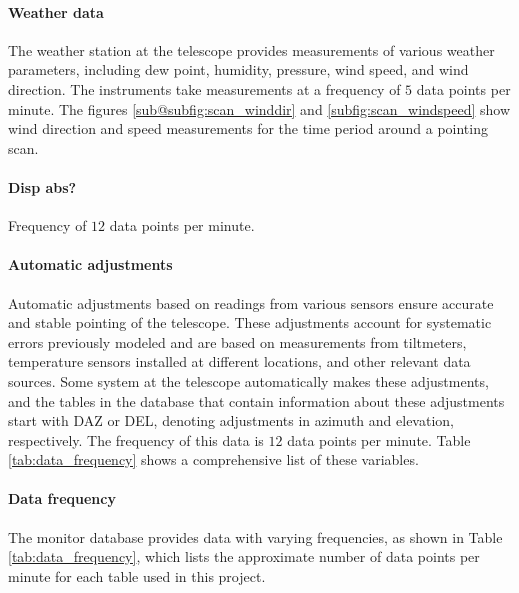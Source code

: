 \paragraph{Weather data}
The weather station at the telescope provides measurements of various weather parameters, including dew point, humidity, pressure, wind speed, and wind direction.
The instruments take measurements at a frequency of $5$ data points per minute.
The figures \ref{sub@subfig:scan_winddir} and \ref{subfig:scan_windspeed} show wind direction and speed measurements for the time period around a pointing scan.


\paragraph{Disp abs?}

Frequency of $12$ data points per minute.

\paragraph{Automatic adjustments}
Automatic adjustments based on readings from various sensors ensure accurate and stable pointing of the telescope.
These adjustments account for systematic errors previously modeled and are based on measurements from tiltmeters, temperature sensors installed at different locations, and other relevant data sources.
Some system at the telescope automatically makes these adjustments, and the tables in the database that contain information about these adjustments start with DAZ or DEL, denoting adjustments in azimuth and elevation, respectively.
The frequency of this data is $12$ data points per minute.
Table \ref{tab:data_frequency} shows a comprehensive list of these variables.

\paragraph{Data frequency}
The monitor database provides data with varying frequencies, as shown in Table \ref{tab:data_frequency},
which lists the approximate number of data points per minute for each table used in this project.


